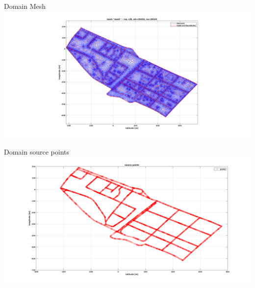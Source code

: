\documentclass{beamer}
\begin{document}
\begin{frame}{Domain Mesh}
\includegraphics[width=\textwidth]{pics/mesh.png}
\end{frame}
\begin{frame}{Domain source points}
\includegraphics[width=\textwidth]{pics/source_points.png}
\end{frame}
\end{document}
